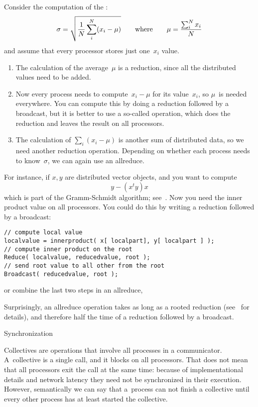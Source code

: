 Consider the computation of the :
\[ \sigma = \sqrt{\frac1N \sum_i^N (x_i-\mu) }
\qquad\hbox{where}\qquad \mu = \frac{\sum_i^Nx_i}N
\]
and assume that every processor stores just one~$x_i$ value.
\begin{enumerate}
\item The calculation of the average~$\mu$ is a reduction, since all
  the distributed values need to be added.
\item Now every
  process needs to compute~$x_i-\mu$ for its value~$x_i$, so $\mu$~is
  needed everywhere. You can compute this by doing a reduction followed
  by a broadcast, but it is better to use a so-called
   operation, which does the reduction and leaves
  the result on all processors.
\item The calculation of $\sum_i(x_i-\mu)$ is another sum of
  distributed data, so we need another reduction operation. Depending
  on whether each process needs to know~$\sigma$, we can again use an
  allreduce.
\end{enumerate}

For instance, if $x,y$ are distributed vector objects, and you want to compute
\[ y- (x^ty)x \]
which is part of the Gramm-Schmidt algorithm; see~.
Now you need the inner product value on all processors. You could do this
by writing a reduction followed by a broadcast:
\lstset{style=reviewcode,language=C}
\begin{lstlisting}
// compute local value
localvalue = innerproduct( x[ localpart], y[ localpart ] );
// compute inner product on the root
Reduce( localvalue, reducedvalue, root );
// send root value to all other from the root
Broadcast( reducedvalue, root );
\end{lstlisting}
or combine the last two steps in an allreduce,

Surprisingly, an allreduce operation takes as
long as a rooted reduction (see~ for details),
and therefore half the time of a reduction followed by a broadcast.

 {Synchronization}

Collectives are operations that involve all processes in a
communicator. %
A~collective is a
single call, and it blocks on all processors.
That does not mean that
all processors exit the call at the same time: because of
implementational details and network
latency they need not be synchronized in their execution.
However, semantically we can say that
a~process can not finish
a collective until every other process has at least started the collective.

